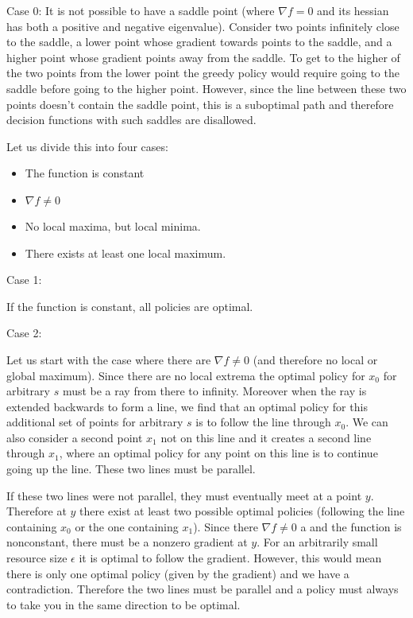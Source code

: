 Case 0:
It is not possible to have a saddle point (where $\nabla f = 0$ and its hessian has both a positive and negative eigenvalue). Consider two points infinitely close to the saddle, a lower point whose gradient towards points to the saddle, and a higher point whose gradient points away from the saddle. To get to the higher of the two points from the lower point the greedy policy would require going to the saddle before going to the higher point. However, since the line between these two points doesn't contain the saddle point, this is a suboptimal path and therefore decision functions with such saddles are disallowed.

Let us divide this into four cases:
\begin{itemize}
    \item The function is constant
    \item $\nabla f \ne 0$
    \item No local maxima, but local minima.
    \item There exists at least one local maximum.
\end{itemize}

Case 1:

If the function is constant, all policies are optimal.

Case 2:

Let us start with the case where there are $\nabla f \ne 0$ (and therefore no local or global maximum). Since there are no local extrema the optimal policy for $x_0$ for arbitrary $s$ must be a ray from there to infinity. Moreover when the ray is extended backwards to form a line, we find that an optimal policy for this additional set of points for arbitrary $s$ is to follow the line through $x_0$. We can also consider a second point $x_1$ not on this line and it creates a second line through $x_1$, where an optimal policy for any point on this line is to continue going up the line. These two lines must be parallel.

If these two lines were not parallel, they must eventually meet at a point $y$. Therefore at $y$ there exist at least two possible optimal policies (following the line containing $x_0$ or the one containing $x_1$). Since there $\nabla f \ne 0$ a and the function is nonconstant, there must be a nonzero gradient at $y$. For an arbitrarily small resource size $\epsilon$ it is optimal to follow the gradient. However, this would mean there is only one optimal policy (given by the gradient) and we have a contradiction. Therefore the two lines must be parallel and a policy must always to take you in the same direction to be optimal.

